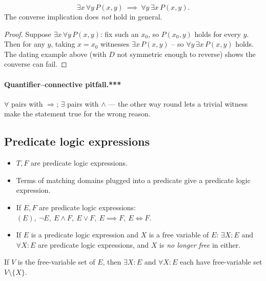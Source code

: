 \begin{proposition}
\[
\exists x\,\forall y\, P(x,y) \ \implies\ \forall y\,\exists x\, P(x,y).
\]
The converse implication does \emph{not} hold in general.
\end{proposition}
\begin{proof}
Suppose $\exists x\,\forall y\,P(x,y)$: fix such an $x_0$, so $P(x_0,y)$ holds for every $y$. Then for any $y$, taking $x=x_0$ witnesses $\exists x\,P(x,y)$ -- so $\forall y\,\exists x\,P(x,y)$ holds. The dating example above (with $D$ not symmetric enough to reverse) shows the converse can fail.
\end{proof}

\paragraph{Quantifier--connective pitfall.***} $\forall$ pairs with
$\Rightarrow$; $\exists$ pairs with $\wedge$ --- the other way round
lets a trivial witness make the statement true for the wrong reason.

\subsection{Predicate logic expressions}
\label{sec:5-11}

\begin{definition}
\begin{itemize}
    \item $T,F$ are predicate logic expressions.
    \item Terms of matching domains plugged into a predicate give a predicate logic expression.
    \item If $E,F$ are predicate logic expressions: $(E),\ \neg E,\ E\wedge F,\ E\vee F,\ E\implies F,\ E\iff F$.
    \item If $E$ is a predicate logic expression and $X$ is a free variable of $E$: $\exists X: E$ and $\forall X: E$ are predicate logic expressions, and $X$ is \emph{no longer free} in either.
\end{itemize}
\end{definition}

\begin{note}
If $V$ is the free-variable set of $E$, then $\exists X: E$ and $\forall X: E$ each have free-variable set $V\setminus\{X\}$.
\end{note}

